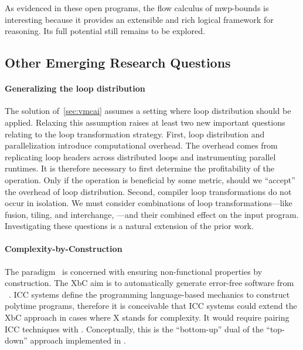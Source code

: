 As evidenced in these open programs, the flow calculus of mwp-bounds is
interesting because it provides an extensible and rich logical framework for
reasoning. Its full potential still remains to be explored.

\subsection{Other Emerging Research Questions}
\label{ssec:other-open}

\paragraph*{Generalizing the loop distribution}
The solution of~\autoref{sec:vmcai} assumes a setting where loop distribution
should be applied. Relaxing this assumption raises at least two new important
questions relating to the loop transformation
strategy. First, loop distribution and parallelization introduce computational
overhead. The overhead comes from replicating loop headers across distributed
loops and instrumenting parallel runtimes. It is therefore necessary to first
determine the profitability of the operation. Only if the operation is
beneficial by some metric, should we \enquote{accept} the overhead of loop
distribution. Second, compiler loop transformations do not occur in isolation.
We must consider combinations of loop transformations---like fusion, tiling, and
interchange, \etc---and their combined
effect on the input program. Investigating these questions is a natural
extension of the prior work.

\paragraph*{Complexity-by-Construction}
The  paradigm~\cite{terbeek2018} is concerned with
ensuring non-functional properties by
construction. The XbC aim is to automatically generate error-free software from
~\cite{terbeek2020}. ICC systems define the programming
language-based mechanics to construct polytime programs, therefore it is
conceivable that ICC systems could extend the XbC approach in cases where X
stands for complexity. It would require pairing ICC techniques with . Conceptually, this is the \enquote{bottom-up} dual of the
\enquote{top-down} approach implemented in .

